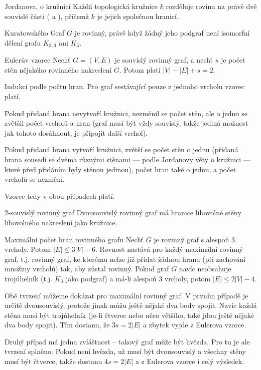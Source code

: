 \begin{vetaN}{Jordanova, o kružnici}
Každá topologická kružnice $k$ rozděluje rovinu na právě dvě souvislé části ( a ), přičemž $k$ je jejich společnou hranicí.
\end{vetaN}

\begin{vetaN}{Kuratowského}
Graf $G$ je rovinný, právě když žádný jeho podgraf není isomorfní dělení grafu $K_{3,3}$ ani $K_5.$
\end{vetaN}

\begin{vetaN}{Eulerův vzorec}
Nechť $G=(V,E)$ je souvislý rovinný graf, a nechť $s$ je počet stěn nějakého rovinného nakreslení $G.$ Potom platí $|V|-|E|+s = 2.$

\medskip
\begin{dukaz}
Indukcí podle počtu hran. Pro graf sestávající pouze z jednoho vrcholu vzorec platí.
\begin{penumerate}
\item Pokud přidaná hrana nevytvoří kružnici, nezměnil se počet stěn, ale o jednu se zvětšil počet vrcholů a hran (graf musí být vždy souvislý, takže jediná možnost jak tohoto dosáhnout, je připojit další vrchol).
\item Pokud přidaná hrana vytvoří kružnici, zvětší se počet stěn o jednu (přidaná hrana sousedí se dvěma různými stěnami --- podle Jordanovy věty o kružnici --- které před přidáním byly stěnou jedinou), počet hran také o jednu, a počet vrcholů se nezmění.
\end{penumerate}
Vzorec tedy v obou případech platí.
\end{dukaz}
\end{vetaN}

\begin{vetaN}{2-souvislý rovinný graf}
Dvousouvislý rovinný graf má hranice libovolné stěny libovolného nakreslení jako kružnice.
\end{vetaN}

\begin{vetaN}{Maximální počet hran rovinného grafu}
Nechť $G$ je rovinný graf s alespoň 3 vrcholy. Potom $|E|\leq 3|V|-6.$ Rovnost nastává pro každý maximální rovinný graf, t.j. rovinný graf, ke kterému nelze již přidat žádnou hranu (při zachování množiny vrcholů) tak, aby zůstal rovinný. Pokud graf $G$ navíc neobsahuje trojúhelník (t.j. $K_3$ jako podgraf) a má-li alespoň 3 vrcholy, potom $|E|\leq 2|V|-4.$

\medskip
\begin{dukaz}
Obě tvrzení můžeme dokázat pro maximální rovinný graf. V prvním případě je určitě dvousouvislý, protože jinak můžu ještě nějaké dva body spojit. Navíc každá stěna musí být trojúhelník (je-li čtverec nebo něco většího, také jdou ještě nějaké dva body spojit). Tím dostanu, že $3s=2|E|$ a zbytek vyjde z Eulerova vzorce.

Druhý případ má jednu zvláštnost -- takový graf může být hvězda. Pro tu je ale tvrzení splněno. Pokud není hvězda, už musí být dvousouvislý a všechny stěny musí být čtverce, takže dostanu $4s=2|E|$ a z Eulerova vzorce i celý výsledek.
\end{dukaz}
\end{vetaN}


